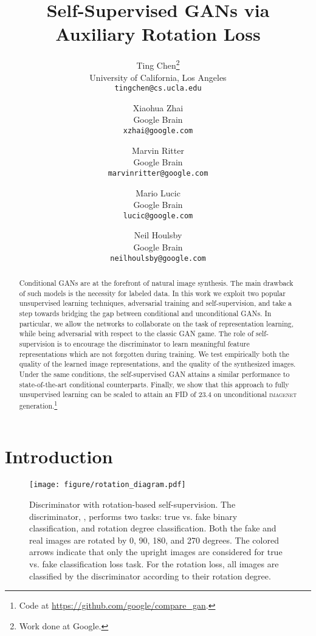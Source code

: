 \documentclass[10pt,twocolumn,letterpaper]{article}
\newcommand{\imagenet}{\textsc{imagenet}}
\begin{document}
\title{Self-Supervised GANs via Auxiliary Rotation Loss}

\author{
Ting Chen\thanks{Work done at Google.}\\
University of California, Los Angeles\\
{\tt\small tingchen@cs.ucla.edu}
\and
Xiaohua Zhai\\
Google Brain\\
{\tt\small xzhai@google.com}
\and
Marvin Ritter\\
Google Brain\\
{\tt\small marvinritter@google.com}
\and
Mario Lucic\\
Google Brain\\
{\tt\small lucic@google.com}
\and
Neil Houlsby\\
Google Brain\\
{\tt\small neilhoulsby@google.com}
}

\maketitle

\begin{abstract}
  Conditional GANs are at the forefront of natural image synthesis. The main drawback of such models is the necessity for labeled data. In this work we exploit two popular unsupervised learning techniques, adversarial training and self-supervision, and take a step towards bridging the gap between conditional and unconditional GANs. In particular, we allow the networks to collaborate on the task of representation learning, while being adversarial with respect to the classic GAN game. The role of self-supervision is to encourage the discriminator to learn meaningful feature representations which are not forgotten during training. We test empirically both the quality of the learned image representations, and the quality of the synthesized images. Under the same conditions, the self-supervised GAN attains a similar performance to state-of-the-art conditional counterparts. Finally, we show that this approach to fully unsupervised learning can be scaled to attain an FID of 23.4 on unconditional \imagenet{} generation.\footnote{Code at \url{https://github.com/google/compare_gan}.}
\end{abstract}
 \section{Introduction}
\begin{figure*}[t!]
\texttt{[image: figure/rotation\_diagram.pdf]}
\caption{
Discriminator with rotation-based self-supervision.
The discriminator, , performs two tasks: true vs. fake binary classification, and rotation degree classification. Both the fake and real images are rotated by 0, 90, 180, and 270 degrees. The colored arrows indicate that only the upright images are considered for true vs. fake classification loss task. For the rotation loss, all images are classified by the discriminator according to their rotation degree.
}
\label{fig:rotation_acgan}
\end{figure*}
\end{document}

